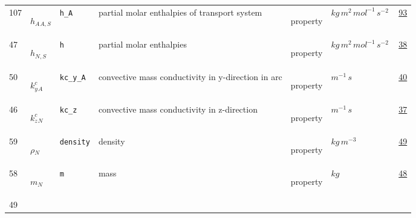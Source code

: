 \begin{longtable}{|p{1cm}|p{2.5cm}|p{4.5cm}|p{8cm}|p{3.0cm}|p{3cm}|p{1cm}|}
                 \\
            107
             & \hypertarget{"v:107"}{ $ {h_A}{_{A, S}} $}
             & \verb|h_A|
             & partial molar enthalpies of transport system
             & \begin{lay}property \end{lay}
             & $ kg \,m^{2} \,mol^{-1} \,s^{-2} \, $
             &                 \hyperlink{"e:93"}{ 93 }
                 \\
            47
             & \hypertarget{"v:47"}{ $ {h}{_{N, S}} $}
             & \verb|h|
             & partial molar enthalpies
             & \begin{lay}property \end{lay}
             & $ kg \,m^{2} \,mol^{-1} \,s^{-2} \, $
             &                 \hyperlink{"e:38"}{ 38 }
                 \\
            50
             & \hypertarget{"v:50"}{ $ {{k^c_y}}{_{A}} $}
             & \verb|kc_y_A|
             &  convective mass conductivity in y-direction in arc
             & \begin{lay}property \end{lay}
             & $ m^{-1} \,s \, $
             &                 \hyperlink{"e:40"}{ 40 }
                 \\
            46
             & \hypertarget{"v:46"}{ $ {{k^c_z}}{_{N}} $}
             & \verb|kc_z|
             &  convective mass conductivity in z-direction
             & \begin{lay}property \end{lay}
             & $ m^{-1} \,s \, $
             &                 \hyperlink{"e:37"}{ 37 }
                 \\
            59
             & \hypertarget{"v:59"}{ $ {\rho}{_{N}} $}
             & \verb|density|
             & density
             & \begin{lay}property \end{lay}
             & $ kg \,m^{-3} \, $
             &                 \hyperlink{"e:49"}{ 49 }
                 \\
            58
             & \hypertarget{"v:58"}{ $ {m}{_{N}} $}
             & \verb|m|
             & mass
             & \begin{lay}property \end{lay}
             & $ kg \, $
             &                 \hyperlink{"e:48"}{ 48 }
                 \\
            49

\end{longtable}
